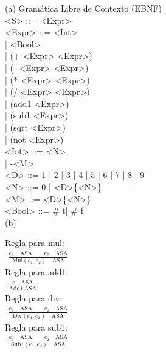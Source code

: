 \documentclass[14pt]{article}
\begin{document}
\begin{enumerate}
(a) Gramática Libre de Contexto (EBNF)\\

<S> ::= <Expr>\\

<Expr> ::= <Int>\\
         | <Bool>\\
         | (+ <Expr> <Expr>)\\
         | (- <Expr> <Expr>)\\
         | (* <Expr> <Expr>)\\
         | (/ <Expr> <Expr>)\\
         | (add1 <Expr>)\\
         | (sub1 <Expr>)\\
         | (sqrt <Expr>)\\
         | (not <Expr>)\\

<Int> ::= <N>\\
        | -<M>\\

<D> ::= 1 | 2 | 3 | 4 | 5 | 6 | 7 | 8 | 9 \\

<N> ::= 0 | <D>\{<N>\} \\

<M> ::= <D>\{<N>\} \\

<Bool> ::= \# t| \# f \\

(b) 

Regla para mul: \\
$\begin{gathered} \frac{e_1 \quad\text{ASA} \quad\quad e_2 \quad\text{ASA}}{\text{Mul}(e_1, e_2)\quad \text{ASA}} \end{gathered}$\\

Regla para add1:\\
$\begin{gathered} \frac{e \quad\text{ASA}}{\text{Add1}~\text{ASA}} \end{gathered}$\\

Regla para div:\\
$\begin{gathered} \frac{e_1 \quad\text{ASA} \quad\quad e_2 \quad\text{ASA}}{\text{Div}(e_1, e_2)\quad \text{ASA}} \end{gathered}$\\

Regla para sub1:\\
$\begin{gathered} \frac{e_1 \quad\text{ASA} \quad\quad e_2 \quad\text{ASA}}{\text{Sub1}(e_1, e_2)\quad \text{ASA}} \end{gathered}$\\


\end{enumerate}
\end{document}
